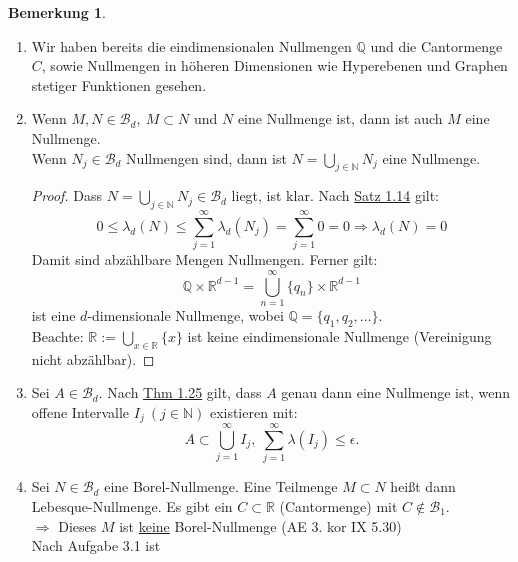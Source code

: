 \documentclass[a4paper]{report}
\newcommand{\R}{\mathbb{R}}
\newcommand{\N}{\mathbb{N}}
\newcommand{\Q}{\mathbb{Q}}
\newcommand{\Borel}{\mathcal{B}}
\newcommand{\Bd}{\Borel_d}
\newcommand{\jlabel}[1]{\label{j_#1}}
\newcommand{\jhyperref}[2]{\hyperref[j_#1]{#2}}
\newcommand{\jlink}[1]{\jhyperref{#1}{#1}}
\theoremstyle{plain}
\theoremstyle{definition}
\newtheorem{bem}[thm]{Bemerkung}
\begin{document}
{{{{\jlabel{Bem 3.2}
\begin{bem}
    \begin{enumerate}
        \item 
            Wir haben bereits die eindimensionalen Nullmengen $\Q$ und die Cantormenge $C$, sowie Nullmengen in höheren Dimensionen wie Hyperebenen und Graphen stetiger Funktionen gesehen.
        \item
            Wenn $M,N\in \Bd, \ M\subset N$ und $N$ eine Nullmenge ist, dann ist auch $M$ eine Nullmenge.\\
            Wenn $N_j \in \Bd$ Nullmengen sind, dann ist $N= \bigcup_{j\in\N} N_j$ eine Nullmenge.
            \begin{proof}
                Dass $N = \bigcup_{j\in\N} N_j \in\Bd$ liegt, ist klar. Nach \jlink{Satz 1.14} gilt:
                \begin{displaymath}
                    0\le \lambda_d(N) \le \sum_{j=1}^\infty \lambda_d(N_j) = \sum_{j=1}^\infty 0 = 0 \Rightarrow \lambda_d(N) = 0
                \end{displaymath}
                Damit sind abzählbare Mengen Nullmengen. Ferner gilt:
                \begin{displaymath}
                    \Q \times \R^{d-1} = \bigcup_{n=1}^\infty \{q_n\} \times \R^{d-1}
                \end{displaymath}
                ist eine $d$-dimensionale Nullmenge, wobei $\Q = \{q_1, q_2, \dots\}$.\\
                Beachte: $\R := \bigcup_{x\in\R} \{x\}$ ist keine eindimensionale Nullmenge (Vereinigung nicht abzählbar).
            \end{proof}
        \item
            Sei $A\in\Bd$. Nach \jlink{Thm 1.25} gilt, dass $A$ genau dann eine Nullmenge ist, wenn offene Intervalle $I_j \ (j\in\N)$ existieren mit:
            \begin{displaymath}
                A\subset \bigcup_{j=1}^\infty I_j, \ \sum_{j=1}^\infty \lambda(I_j) \le \epsilon.
            \end{displaymath}
        \item
            Sei $N\in\Bd$ eine Borel-Nullmenge. Eine Teilmenge $M\subset N$ heißt dann Lebesque-Nullmenge. Es gibt ein $C\subset \R$ (Cantormenge) mit $C \notin \Borel_1$.\\
            $\Rightarrow$ Dieses $M$ ist \uline{keine} Borel-Nullmenge (AE 3. kor IX 5.30)\\
            Nach Aufgabe 3.1 ist 

\end{enumerate}
\end{bem}}}}}
\end{document}
